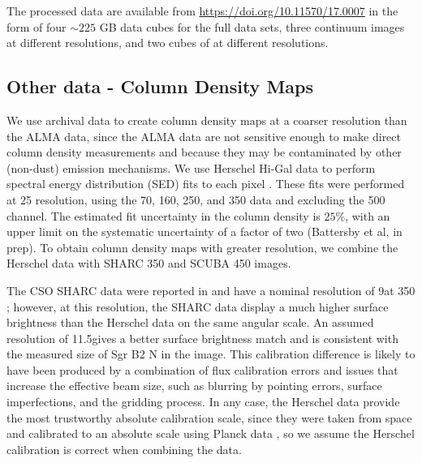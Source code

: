 \documentclass[twocolumn]{aastex61}
\begin{document}
The processed data are available from \url{https://doi.org/10.11570/17.0007} in
the form of four $\sim225$ GB data cubes for the full data sets, three
continuum images at different resolutions, and two cubes of \cyanoacetylene at
different resolutions. 

\subsection{Other data - Column Density Maps}
\label{sec:colmaps}
We use archival data to create column density maps at a coarser
resolution than the ALMA data, since the ALMA data are not sensitive
enough to make direct column density measurements and because they
may be contaminated by other (non-dust) emission mechanisms.   We use Herschel
Hi-Gal data \citep{Molinari2010a} to perform spectral energy distribution (SED)
fits to each pixel
\citep[][and in prep]{Battersby2011a}.  These fits were performed at 25\arcsec
resolution, using the 70, 160, 250, and 350 \um data and excluding the 500 \um
channel.  The estimated fit uncertainty in the column density is $25\%$, with
an upper limit on the systematic uncertainty of a factor of two (Battersby et
al, in prep).  To obtain column density maps with greater resolution, we
combine the Herschel data with SHARC 350 \um and SCUBA 450 \um images.


The CSO SHARC data were reported in \citet{Bally2010a} and have a nominal
resolution of 9\arcsec at 350 \um; however, at this resolution, the SHARC data
display a much higher surface brightness than the Herschel data on the same
angular scale.  An assumed resolution of 11.5\arcsec gives a better surface
brightness match and is consistent with the measured size of Sgr B2 N in the
image.
This calibration difference is likely to have been produced by a combination of
flux calibration errors and issues that increase the effective beam size, such
as blurring by pointing errors, surface imperfections, and the gridding
process.
In any case, the Herschel data provide the most
trustworthy absolute calibration scale, since they were taken from space and
calibrated to an absolute scale using Planck data
\citep{Bendo2013a,Bertincourt2016a}, so we assume the Herschel calibration is
correct when combining the data.
\end{document}
